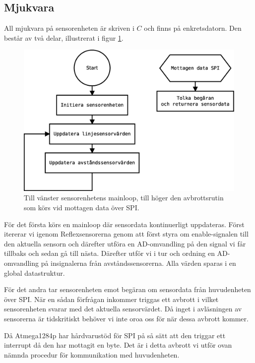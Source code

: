 \subsection{Mjukvara}

All mjukvara på sensorenheten är skriven i $C$ och finns på enkretsdatorn. Den består av två delar, illustrerat i figur \ref{sensorenhet-mjukvara}.

\begin{figure}[h!]
	\centering
	\includegraphics[scale=0.4]{grafik/sensorenhet-mjukvara}
	\caption{Till vänster sensorenhetens mainloop, till höger den avbrottsrutin som körs vid mottagen data över SPI.} \label{sensorenhet-mjukvara}
\end{figure}

För det första körs en mainloop där sensordata kontinuerligt uppdateras. Först itererar vi igenom Reflexsensorerna genom att först styra om enable-signalen till den aktuella sensorn och därefter utföra en AD-omvandling på den signal vi får tillbaks och sedan gå till nästa. Därefter utför vi i tur och ordning en AD-omvandling på insignalerna från avståndssensorerna. Alla värden sparas i en global datastruktur.

För det andra tar sensorenheten emot begäran om sensordata från huvudenheten över SPI. När en sådan förfrågan inkommer triggas ett avbrott i vilket sensorenheten svarar med det aktuella sensorvärdet. Då inget i avläsningen av sensorerna är tidskritiskt behöver vi inte oroa oss för när dessa avbrott kommer.

Då Atmega1284p har hårdvarustöd för SPI på så sätt att den triggar ett interrupt då den har mottagit en byte. Det är i detta avbrott vi utför ovan nämnda procedur för kommunikation med huvudenheten.
